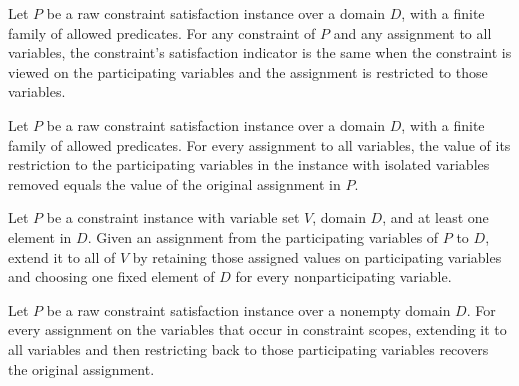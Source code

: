 \begin{theorem}
\label{FABL.RawCSPInstance.participatingConstraint_satisfiedIndicator}
\leanok
{}
Let $P$ be a raw constraint satisfaction instance over a domain $D$, with a finite
family of allowed predicates. For any constraint of $P$ and any assignment to all
variables, the constraint's satisfaction indicator is the same when the constraint is
viewed on the participating variables and the assignment is restricted to those
variables.
\end{theorem}

\begin{theorem}
\label{FABL.RawCSPInstance.value_restrictAssignment}
\leanok
{}
Let $P$ be a raw constraint satisfaction instance over a domain $D$, with a finite
family of allowed predicates. For every assignment to all variables, the value of its
restriction to the participating variables in the instance with isolated variables
removed equals the value of the original assignment in $P$.
\end{theorem}

\begin{definition}
\label{FABL.RawCSPInstance.extendAssignment}
\leanok
{}
Let $P$ be a constraint instance with variable set $V$, domain $D$, and at least one
element in $D$. Given an assignment from the participating variables of $P$ to $D$,
extend it to all of $V$ by retaining those assigned values on participating variables
and choosing one fixed element of $D$ for every nonparticipating variable.
\end{definition}

\begin{theorem}
\label{FABL.RawCSPInstance.restrictAssignment_extendAssignment}
\leanok
{}
Let $P$ be a raw constraint satisfaction instance over a nonempty domain $D$. For every
assignment on the variables that occur in constraint scopes, extending it to all
variables and then restricting back to those participating variables recovers the
original assignment.
\end{theorem}

